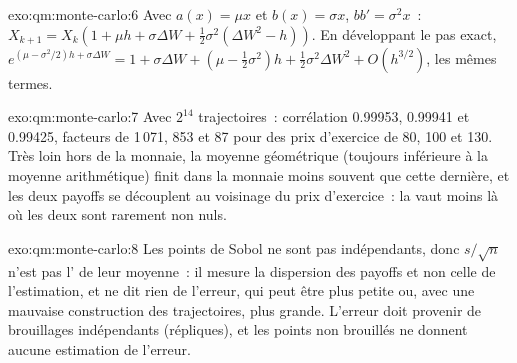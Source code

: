 \begin{solution}{exo:qm:monte-carlo:6}
Avec $a(x) = \mu x$ et $b(x) = \sigma x$, $bb' = \sigma^2x$~: $X_{k+1} = X_k(1 + \mu h + \sigma\Delta W + \frac12\sigma^2(\Delta W^2 - h))$. En développant le pas exact,
$e^{(\mu - \sigma^2/2)h + \sigma\Delta W} = 1 + \sigma\Delta W + (\mu - \frac12\sigma^2)h + \frac12\sigma^2\Delta W^2 + O(h^{3/2})$, les mêmes termes.
\end{solution}

\begin{solution}{exo:qm:monte-carlo:7}
Avec $2^{14}$ trajectoires~: corrélation 0.99953, 0.99941 et 0.99425, facteurs de  1\,071, 853 et 87 pour des prix d'exercice de 80, 100 et 130. Très loin hors de la monnaie, la moyenne géométrique (toujours inférieure à la
moyenne arithmétique) finit dans la monnaie moins souvent que cette dernière, et les deux payoffs se découplent au voisinage du prix d'exercice~: la  vaut moins là où les deux sont rarement non nuls.
\end{solution}

\begin{solution}{exo:qm:monte-carlo:8}
Les points de Sobol ne sont pas indépendants, donc $s/\sqrt n$ n'est pas l' de leur moyenne~: il mesure la dispersion des payoffs et non celle de l'estimation, et ne dit rien de l'erreur, qui
peut être plus petite ou, avec une mauvaise construction des trajectoires, plus grande. L'erreur doit provenir de brouillages indépendants (répliques), et les points non brouillés ne donnent aucune estimation de l'erreur.
\end{solution}

